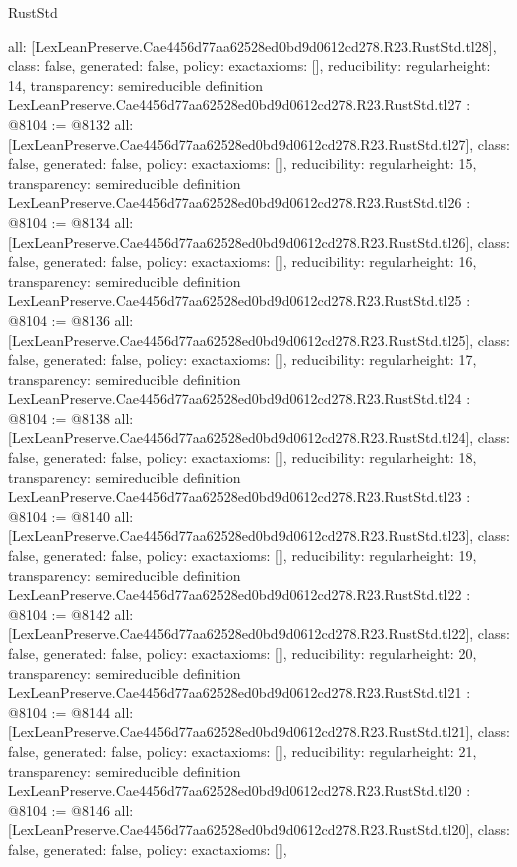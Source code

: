 \begin{lexlean}{RustStd}
\begin{coremodule}
{  all: [LexLeanPreserve.Cae4456d77aa62528ed0bd9d0612cd278.R23.RustStd.tl28],
  class: false,
  generated: false,
  policy: exact{axioms: []},
  reducibility: regular{height: 14},
  transparency: semireducible
}
definition LexLeanPreserve.Cae4456d77aa62528ed0bd9d0612cd278.R23.RustStd.tl27 : @8104 := @8132 {
  all: [LexLeanPreserve.Cae4456d77aa62528ed0bd9d0612cd278.R23.RustStd.tl27],
  class: false,
  generated: false,
  policy: exact{axioms: []},
  reducibility: regular{height: 15},
  transparency: semireducible
}
definition LexLeanPreserve.Cae4456d77aa62528ed0bd9d0612cd278.R23.RustStd.tl26 : @8104 := @8134 {
  all: [LexLeanPreserve.Cae4456d77aa62528ed0bd9d0612cd278.R23.RustStd.tl26],
  class: false,
  generated: false,
  policy: exact{axioms: []},
  reducibility: regular{height: 16},
  transparency: semireducible
}
definition LexLeanPreserve.Cae4456d77aa62528ed0bd9d0612cd278.R23.RustStd.tl25 : @8104 := @8136 {
  all: [LexLeanPreserve.Cae4456d77aa62528ed0bd9d0612cd278.R23.RustStd.tl25],
  class: false,
  generated: false,
  policy: exact{axioms: []},
  reducibility: regular{height: 17},
  transparency: semireducible
}
definition LexLeanPreserve.Cae4456d77aa62528ed0bd9d0612cd278.R23.RustStd.tl24 : @8104 := @8138 {
  all: [LexLeanPreserve.Cae4456d77aa62528ed0bd9d0612cd278.R23.RustStd.tl24],
  class: false,
  generated: false,
  policy: exact{axioms: []},
  reducibility: regular{height: 18},
  transparency: semireducible
}
definition LexLeanPreserve.Cae4456d77aa62528ed0bd9d0612cd278.R23.RustStd.tl23 : @8104 := @8140 {
  all: [LexLeanPreserve.Cae4456d77aa62528ed0bd9d0612cd278.R23.RustStd.tl23],
  class: false,
  generated: false,
  policy: exact{axioms: []},
  reducibility: regular{height: 19},
  transparency: semireducible
}
definition LexLeanPreserve.Cae4456d77aa62528ed0bd9d0612cd278.R23.RustStd.tl22 : @8104 := @8142 {
  all: [LexLeanPreserve.Cae4456d77aa62528ed0bd9d0612cd278.R23.RustStd.tl22],
  class: false,
  generated: false,
  policy: exact{axioms: []},
  reducibility: regular{height: 20},
  transparency: semireducible
}
definition LexLeanPreserve.Cae4456d77aa62528ed0bd9d0612cd278.R23.RustStd.tl21 : @8104 := @8144 {
  all: [LexLeanPreserve.Cae4456d77aa62528ed0bd9d0612cd278.R23.RustStd.tl21],
  class: false,
  generated: false,
  policy: exact{axioms: []},
  reducibility: regular{height: 21},
  transparency: semireducible
}
definition LexLeanPreserve.Cae4456d77aa62528ed0bd9d0612cd278.R23.RustStd.tl20 : @8104 := @8146 {
  all: [LexLeanPreserve.Cae4456d77aa62528ed0bd9d0612cd278.R23.RustStd.tl20],
  class: false,
  generated: false,
  policy: exact{axioms: []},
}
\end{coremodule}
\end{lexlean}
